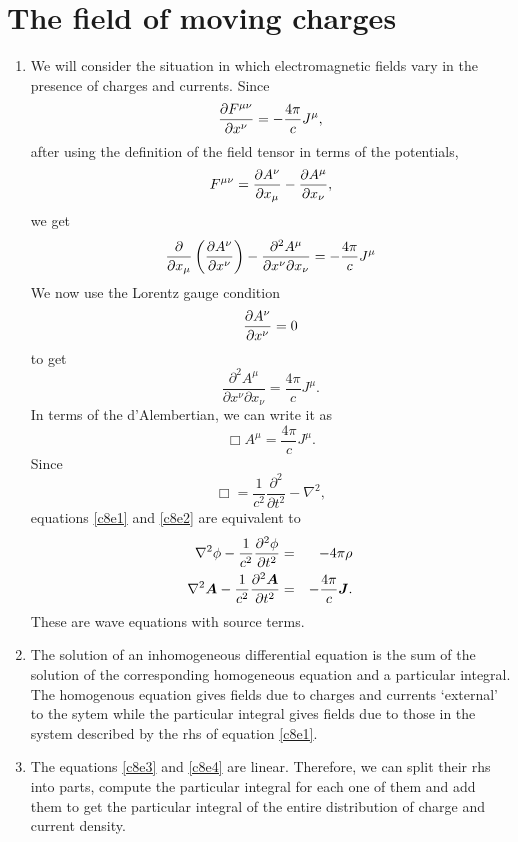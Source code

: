 \chapter{The field of moving charges}\label{c8}
\begin{enumerate}
\item We will consider the situation in which electromagnetic fields vary in the
presence of charges and currents. Since
\[
\frac{\partial{F^{\mu\nu}}}{\partial{x^\nu}} = -\frac{4\pi}{c}J^\mu,
\]
after using the definition of the field tensor in terms of the potentials,
\[
F^{\mu\nu} = \frac{\partial{A^\nu}}{\partial{x_\mu}} - \frac{\partial{A^\mu}}{\partial{x_\nu}},
\]
we get
\[
\frac{\partial}{\partial x_\mu}\left(\frac{\partial{A^\nu}}{\partial{x^\nu}}\right) - 
\frac{\partial^2 A^\mu}{\partial x^\nu \partial x_\nu} = -\frac{4\pi}{c}J^\mu
\]
We now use the Lorentz gauge condition
\[
\frac{\partial{A^\nu}}{\partial{x^\nu}} = 0
\]
to get
\begin{equation}\label{c8e1}
\frac{\partial^2 A^\mu}{\partial x^\nu \partial x_\nu} = \frac{4\pi}{c}J^\mu.
\end{equation}
In terms of the d'Alembertian, we can write it as
\begin{equation}\label{c8e2}
\Box A^\mu = \frac{4\pi}{c}J^\mu.
\end{equation}
Since
\[
\Box = \frac{1}{c^2}\frac{\partial^2}{\partial t^2} - \nabla^2,
\]
equations \eqref{c8e1} and \eqref{c8e2} are equivalent to
\begin{eqnarray}
\nabla^2\phi - \frac{1}{c^2}\frac{\partial^2{\phi}}{\partial{t}^2} &=& -4\pi\rho \label{c8e3} \\
\nabla^2\bm{A} - \frac{1}{c^2}\frac{\partial^2{\bm{A}}}{\partial{t}^2} &=& 
-\frac{4\pi}{c}\bm{J}. \label{c8e4}
\end{eqnarray}
These are wave equations with source terms.

\item The solution of an inhomogeneous differential equation is the sum of the
solution of the corresponding homogeneous equation and a particular integral.
The homogenous equation gives fields due to charges and currents `external' to
the sytem while the particular integral gives fields due to those in the system
described by the rhs of equation \eqref{c8e1}. 

\item The equations \eqref{c8e3} and \eqref{c8e4} are linear. Therefore, we can
split their rhs into parts, compute the particular integral for each one of them
and add them to get the particular integral of the entire distribution of charge
and current density.


\end{enumerate}
